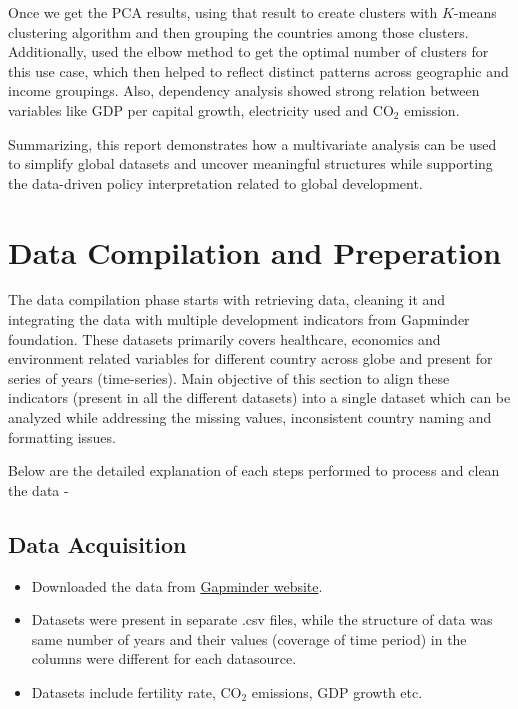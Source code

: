 \documentclass{article}
\begin{document}
Once we get the PCA results, using that result to create clusters with $K$-means clustering algorithm and then grouping the countries among those clusters. Additionally, used the elbow method to get the optimal number of clusters for this use case, which then helped to reflect distinct patterns across geographic and income groupings. Also, dependency analysis showed strong relation between variables like GDP per capital growth, electricity used and $\mathrm{CO}_2$ emission.

Summarizing, this report demonstrates how a multivariate analysis can be used to simplify global datasets and uncover meaningful structures while supporting the data-driven policy interpretation related to global development.



\section{Data Compilation and Preperation}

The data compilation phase starts with retrieving data, cleaning it and integrating the data with multiple development indicators from Gapminder foundation. These datasets primarily covers healthcare, economics and environment related variables for different country across globe and present for series of years (time-series). Main objective of this section to align these indicators (present in all the different datasets) into a single dataset which can be analyzed while addressing the missing values, inconsistent country naming and formatting issues. 

Below are the detailed explanation of each steps performed to process and clean the data -     

\subsection{Data Acquisition}
\begin{itemize}
    \item Downloaded the data from \href{http://www.gapminder.org/data/}{Gapminder website}.\cite{gapminder}
    \item Datasets were present in separate .csv files, while the structure of data was same number of years and their values (coverage of time period) in the columns were different for each datasource.
    \item Datasets include fertility rate, $\mathrm{CO}_2$ emissions, GDP growth etc.
\end{itemize}
\end{document}
